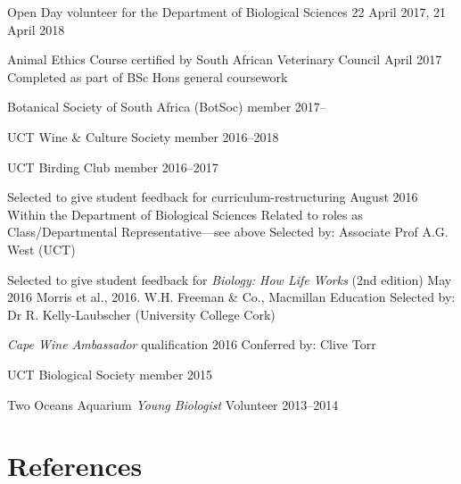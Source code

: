 \documentclass[10pt]{article}
\begin{document}
\begin{hangparas}{2em}{1}

Open Day volunteer for the Department of Biological Sciences
                                    \hfill 22 April 2017, 21 April 2018

Animal Ethics Course certified by South African Veterinary Council
                                                        \hfill April 2017 \break
Completed as part of BSc Hons general coursework

Botanical Society of South Africa (BotSoc) member         \hfill 2017--

UCT Wine \& Culture Society member                    \hfill 2016--2018

UCT Birding Club member                               \hfill 2016--2017

Selected to give student feedback for curriculum-restructuring
                                              \hfill August 2016 \break
Within the Department of Biological Sciences \break
Related to roles as Class/Departmental Representative---see above \break
Selected by: Associate Prof A.G. West (UCT)

Selected to give student feedback for \textit{Biology: How Life Works} (2nd 
edition)                                         \hfill May 2016 \break
Morris et al., 2016. W.H. Freeman \& Co., Macmillan Education \break
Selected by: Dr R. Kelly-Laubscher (University College Cork)

\textit{Cape Wine Ambassador} qualification          \hfill 2016 \break
Conferred by: Clive Torr

UCT Biological Society member                               \hfill 2015

Two Oceans Aquarium \textit{Young Biologist} Volunteer \hfill 2013--2014

\hfill

\end{hangparas}

\hrulefill

\section*{References} %
\end{document}
